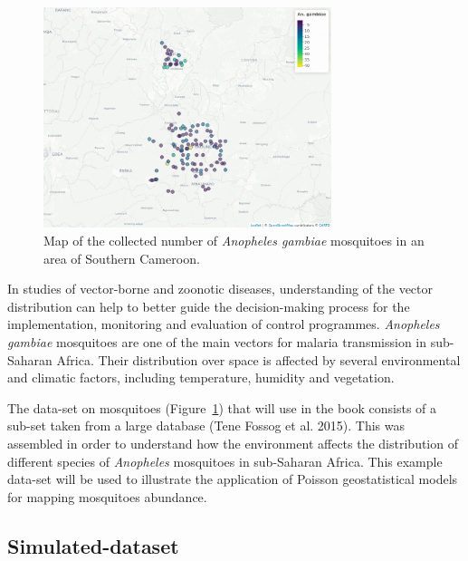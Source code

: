 \documentclass[
  letterpaper,
]{krantz}
\begin{document}
\begin{figure}

{\centering \includegraphics[width=3.31in,height=\textheight]{./figures/anopheles_ch1.png}

}

\caption{\label{fig-anopheles-ch1}Map of the collected number of
\emph{Anopheles gambiae} mosquitoes in an area of Southern Cameroon.}

\end{figure}

In studies of vector-borne and zoonotic diseases, understanding of the
vector distribution can help to better guide the decision-making process
for the implementation, monitoring and evaluation of control programmes.
\emph{Anopheles gambiae} mosquitoes are one of the main vectors for
malaria transmission in sub-Saharan Africa. Their distribution over
space is affected by several environmental and climatic factors,
including temperature, humidity and vegetation.

The data-set on mosquitoes (Figure~\ref{fig-anopheles-ch1}) that will
use in the book consists of a sub-set taken from a large database (Tene
Fossog et al. 2015). This was assembled in order to understand how the
environment affects the distribution of different species of
\emph{Anopheles} mosquitoes in sub-Saharan Africa. This example data-set
will be used to illustrate the application of Poisson geostatistical
models for mapping mosquitoes abundance.

\hypertarget{sec-italy-sim-data-ch1}{%
\subsection{Simulated-dataset}\label{sec-italy-sim-data-ch1}}
\end{document}
